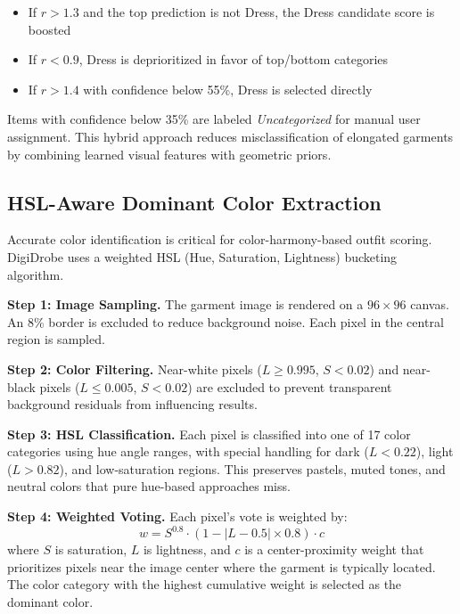 \documentclass[conference]{IEEEtran}
\begin{document}
\begin{itemize}
    \item If $r > 1.3$ and the top prediction is not Dress, the Dress candidate score is boosted
    \item If $r < 0.9$, Dress is deprioritized in favor of top/bottom categories
    \item If $r > 1.4$ with confidence below 55\%, Dress is selected directly
\end{itemize}

Items with confidence below 35\% are labeled \textit{Uncategorized} for manual user assignment. This hybrid approach reduces misclassification of elongated garments by combining learned visual features with geometric priors.

\subsection{HSL-Aware Dominant Color Extraction}

Accurate color identification is critical for color-harmony-based outfit scoring. DigiDrobe uses a weighted HSL (Hue, Saturation, Lightness) bucketing algorithm.

\textbf{Step 1: Image Sampling.} The garment image is rendered on a $96 \times 96$ canvas. An 8\% border is excluded to reduce background noise. Each pixel in the central region is sampled.

\textbf{Step 2: Color Filtering.} Near-white pixels ($L \geq 0.995$, $S < 0.02$) and near-black pixels ($L \leq 0.005$, $S < 0.02$) are excluded to prevent transparent background residuals from influencing results.

\textbf{Step 3: HSL Classification.} Each pixel is classified into one of 17 color categories using hue angle ranges, with special handling for dark ($L < 0.22$), light ($L > 0.82$), and low-saturation regions. This preserves pastels, muted tones, and neutral colors that pure hue-based approaches miss.

\textbf{Step 4: Weighted Voting.} Each pixel's vote is weighted by:
\begin{equation}
    w = S^{0.8} \cdot (1 - |L - 0.5| \times 0.8) \cdot c
\end{equation}
where $S$ is saturation, $L$ is lightness, and $c$ is a center-proximity weight that prioritizes pixels near the image center where the garment is typically located. The color category with the highest cumulative weight is selected as the dominant color.
\end{document}
